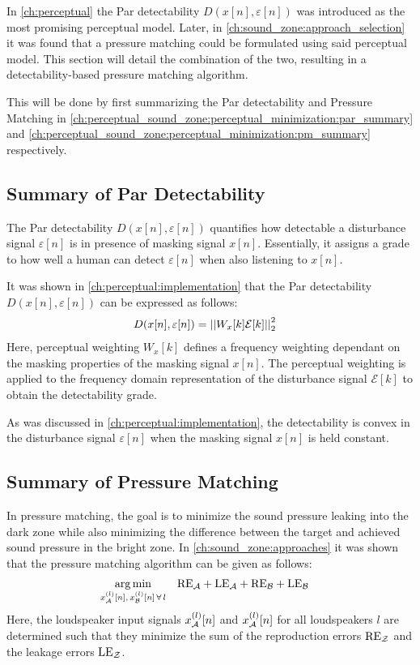 In \autoref{ch:perceptual} the Par detectability $D(x[n],\varepsilon[n])$ was introduced as the most promising perceptual model.
Later, in \autoref{ch:sound_zone:approach_selection} it was found that a pressure matching could be formulated using said perceptual model.
This section will detail the combination of the two, resulting in a detectability-based pressure matching algorithm.

This will be done by first summarizing the Par detectability and Pressure Matching in 
\autoref{ch:perceptual_sound_zone:perceptual_minimization:par_summary} and 
\autoref{ch:perceptual_sound_zone:perceptual_minimization:pm_summary} respectively.

\subsection{Summary of Par Detectability}
\label{ch:perceptual_sound_zone:perceptual_minimization:par_summary}
The Par detectability $D(x[n],\varepsilon[n])$ quantifies how detectable a disturbance signal $\varepsilon[n]$ is in presence of masking signal $x[n]$.
Essentially, it assigns a grade to how well a human can detect $\varepsilon[n]$ when also listening to $x[n]$.  

It was shown in \autoref{ch:perceptual:implementation} that the Par detectability $D(x[n],\varepsilon[n])$ can be expressed as follows: 
\begin{align}
    D(x[n],\varepsilon[n]) &= \norm[2][2]{W_{x}[k]\mathcal{E}[k]} 
\end{align}
Here, perceptual weighting $W_{x}[k]$ defines a frequency weighting dependant on the masking properties of the masking signal $x[n]$.
The perceptual weighting is applied to the frequency domain representation of the disturbance signal $\mathcal{E}[k]$ to obtain the detectability grade.

As was discussed in \autoref{ch:perceptual:implementation}, the detectability is convex in the disturbance signal $\varepsilon[n]$ 
when the masking signal $x[n]$ is held constant.

\subsection{Summary of Pressure Matching}
\label{ch:perceptual_sound_zone:perceptual_minimization:pm_summary}
In pressure matching, the goal is to minimize the sound pressure leaking into the dark zone while also minimizing the difference between the target and achieved sound pressure in the bright zone.
In \autoref{ch:sound_zone:approaches} it was shown that the pressure matching algorithm can be given as follows:
\begin{align}
    \argmin{x_\za^{(l)}[n],\,x_\zb^{(l)}[n]\,\forall\,l}{
       &\text{RE}_\za + \text{LE}_\za + \text{RE}_\zb + \text{LE}_\zb
    }
\end{align}
Here, the loudspeaker input signals $x_{\mathcal{A}}^{(l)}[n]$ and $x_{\mathcal{A}}^{(l)}[n]$ for all loudspeakers $l$ are determined 
such that they minimize the sum of the
reproduction errors $\text{RE}_{\mathcal{Z}}$ and the leakage errors $\text{LE}_{\mathcal{Z}}$.

